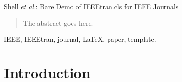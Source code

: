 \documentclass[journal]{IEEEtran}
\begin{document}
%
{Shell \MakeLowercase{\textit{et al.}}: Bare Demo of IEEEtran.cls for IEEE Journals}
% 











\maketitle

\begin{abstract}
The abstract goes here.
\end{abstract}

\begin{IEEEkeywords}
IEEE, IEEEtran, journal, \LaTeX, paper, template.
\end{IEEEkeywords}






%
\IEEEpeerreviewmaketitle



\section{Introduction}
% 
% 
% 
% 
\end{document}
